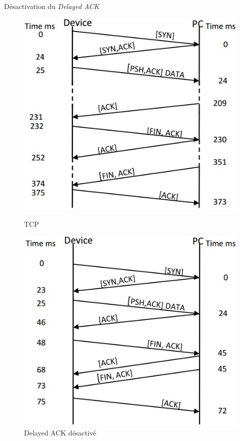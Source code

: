 \begin{frame}{Désactivation du \textit{Delayed ACK} }
\begin{figure}
  \begin{minipage}[c]{.46\linewidth}
  \includegraphics[scale=0.4]{figures/TCPlatences.jpg}
  \caption{TCP}
  \label{tcplatences}
 \end{minipage}
 \begin{minipage}[c]{.46\linewidth}
  \includegraphics[scale=0.4]{figures/delayedACK.jpg}
  \caption{Delayed ACK désactivé}
  \end{minipage}
 \end{figure}
\end{frame}

